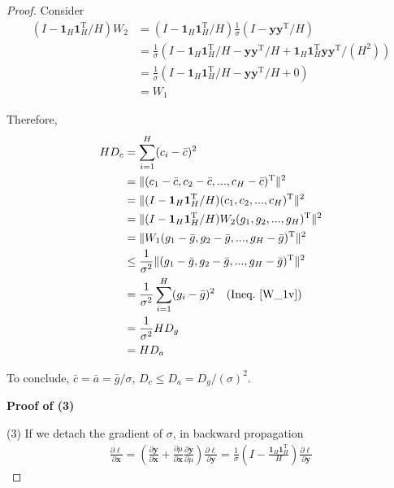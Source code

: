 \documentclass{article}
\newcommand*{\vect}[1]{\textbf{#1}}
\begin{document}
\begin{proof}
Consider
\begin{equation}\begin{aligned}
(I-\vect{1}_H\vect{1}_H^\text{T}/H)W_2&=(I-\vect{1}_H\vect{1}_H^\text{T}/H)\frac{1}{\sigma}(I-{\vect{y}\vect{y}^\text{T}}/{H})\\
&=\frac{1}{\sigma}(I-\vect{1}_H\vect{1}_H^\text{T}/H-{\vect{y}\vect{y}^\text{T}}/{H}+\vect{1}_H\vect{1}_H^\text{T}{\vect{y}\vect{y}^\text{T}}/(H^2))\\
&=\frac{1}{\sigma}(I-\vect{1}_H\vect{1}_H^\text{T}/H-{\vect{y}\vect{y}^\text{T}}/{H}+0)\\
&=W_1
\end{aligned}\end{equation}

Therefore, 
\begin{equation}\begin{aligned}
HD_c&=\sum\limits_{i=1}^{H}(c_i-\bar c)^2\\
&=\|(c_1-\bar c, c_2-\bar c, ..., c_H-\bar c)^\text{T}\|^2\\
&=\|(I-\vect{1}_H\vect{1}_H^\text{T}/H)(c_1, c_2, ..., c_H)^\text{T}\|^2\\
&=\|(I-\vect{1}_H\vect{1}_H^\text{T}/H)W_2(g_1, g_2,..., g_H)^\text{T}\|^2\\
&=\|W_1(g_1-\bar g, g_2-\bar g,..., g_H-\bar g)^\text{T}\|^2\\
&\le \frac{1}{\sigma^2}\|(g_1-\bar g, g_2-\bar g,..., g_H-\bar g)^\text{T}\|^2\\
&=\frac{1}{\sigma^2}\sum\limits_{i=1}^H(g_i-\bar g)^2\quad (\text{Ineq.~\ref{W_1v}})\\
&=\frac{1}{\sigma^2}HD_g\\
&=HD_a
\end{aligned}\end{equation}

To conclude, $\bar c=\bar a=\bar g/\sigma$, $D_c\le D_a=D_g/(\sigma)^2$.

\textbf{Proof of (3)}

(3) If we detach the gradient of $\sigma$, in backward propagation
\begin{equation}\begin{aligned}
\frac{\partial\ell}{\partial\vect{x}}=(\frac{\partial\vect{y}}{\partial\vect{x}}+\frac{\partial\mu}{\partial\vect{x}}\frac{\partial\vect{y}}{\partial\mu})\frac{\partial\ell}{\partial\vect{y}}=\frac{1}{\sigma}(I-\frac{\vect{1}_H\vect{1}_H^\text{T}}{H})\frac{\partial\ell}{\partial\vect{y}}
\end{aligned}\end{equation}


\end{proof}
\end{document}
